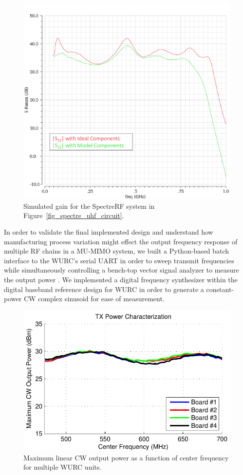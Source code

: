 \begin{figure}[ht]
\centering
  \includegraphics[width=0.7\linewidth]{figs/matching/spectre_simulation_results}   
    \caption{Simulated gain for the SpectreRF system in Figure~\ref{fig_spectre_uhf_circuit}.}
\label{fig_spectre_uhf_results}
\end{figure}
	

	In order to validate the final implemented design and understand how manufacturing process variation might effect the output frequency response of multiple RF chains in a \ac{MU-MIMO} system, we built a Python-based batch interface to the \ac{WURC}'s serial UART in order to sweep transmit frequencies while simultaneously controlling a bench-top vector signal analyzer to measure the output power \cite{guerra2012wurc_cal}.
	We implemented a digital frequency synthesizer within the digital baseband reference design for \ac{WURC} in order to generate a constant-power \ac{CW} complex sinusoid for ease of measurement.

\begin{figure}[ht!]
\centering
  \includegraphics[width=0.8\linewidth]{figs/wurc/wurc_tx_power_plot}
    \caption{Maximum linear \ac{CW} output power as a function of center frequency for multiple \ac{WURC} units.}
		\label{fig_wurc_linear_power}
\end{figure}

